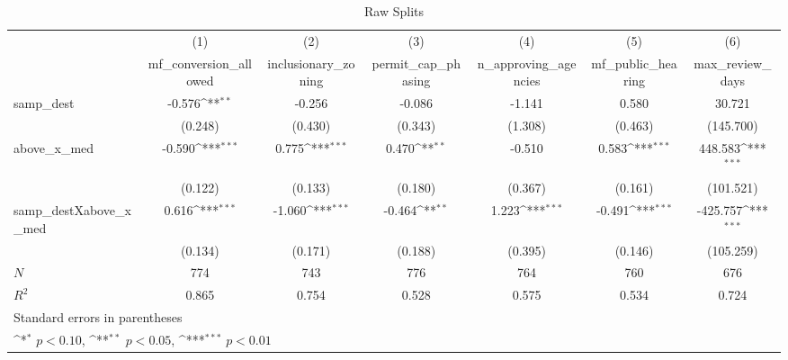 \begin{table}[htbp]\centering
\def\sym#1{\ifmmode^{#1}\else\(^{#1}\)\fi}
\caption{Raw Splits}
\begin{tabular}{l*{6}{c}}
\hline\hline
            &\multicolumn{1}{c}{(1)}&\multicolumn{1}{c}{(2)}&\multicolumn{1}{c}{(3)}&\multicolumn{1}{c}{(4)}&\multicolumn{1}{c}{(5)}&\multicolumn{1}{c}{(6)}\\
            &\multicolumn{1}{c}{mf\_conversion\_allowed}&\multicolumn{1}{c}{inclusionary\_zoning}&\multicolumn{1}{c}{permit\_cap\_phasing}&\multicolumn{1}{c}{n\_approving\_agencies}&\multicolumn{1}{c}{mf\_public\_hearing}&\multicolumn{1}{c}{max\_review\_days}\\
\hline
samp\_dest   &      -0.576\sym{**} &      -0.256         &      -0.086         &      -1.141         &       0.580         &      30.721         \\
            &     (0.248)         &     (0.430)         &     (0.343)         &     (1.308)         &     (0.463)         &   (145.700)         \\
[1em]
above\_x\_med &      -0.590\sym{***}&       0.775\sym{***}&       0.470\sym{**} &      -0.510         &       0.583\sym{***}&     448.583\sym{***}\\
            &     (0.122)         &     (0.133)         &     (0.180)         &     (0.367)         &     (0.161)         &   (101.521)         \\
[1em]
samp\_destXabove\_x\_med&       0.616\sym{***}&      -1.060\sym{***}&      -0.464\sym{**} &       1.223\sym{***}&      -0.491\sym{***}&    -425.757\sym{***}\\
            &     (0.134)         &     (0.171)         &     (0.188)         &     (0.395)         &     (0.146)         &   (105.259)         \\
\hline
\(N\)       &         774         &         743         &         776         &         764         &         760         &         676         \\
\(R^{2}\)   &       0.865         &       0.754         &       0.528         &       0.575         &       0.534         &       0.724         \\
\hline\hline
\multicolumn{7}{l}{\footnotesize Standard errors in parentheses}\\
\multicolumn{7}{l}{\footnotesize \sym{*} \(p<0.10\), \sym{**} \(p<0.05\), \sym{***} \(p<0.01\)}\\
\end{tabular}
\end{table}
